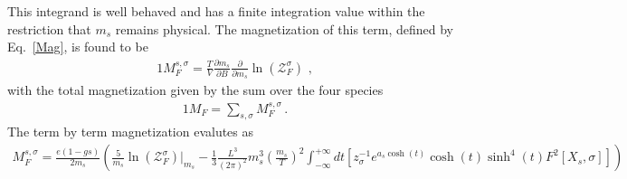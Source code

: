 \documentclass[
aps,
pra,
showpacs,
preprintnumbers,
amsmath,
amssymb,
footinbib
]{revtex4-2}
\newcommand*{\req}[1]{Eq.~{\eqref{#1}}}
\begin{document}
This integrand is well behaved and has a finite integration value within the restriction that $m_{s}$ remains physical. The magnetization of this term, defined by \req{Mag}, is found to be
\begin{alignat}{1}
    \label{FreelikeMag} M_{F}^{s,\sigma}=\frac{T}{V}\frac{\partial m_{s}}{\partial B}\frac{\partial}{\partial m_{s}}\ln(\mathcal{Z}_{F}^{\sigma})\,\,,
\end{alignat}
with the total magnetization given by the sum over the four species
\begin{alignat}{1}
    \label{TotalFreeMag} M_{F}=\sum_{s,\sigma}M_{F}^{s,\sigma}\,.
\end{alignat}
The term by term magnetization evalutes as
\begin{align}
  \label{MagExplicit} M_{F}^{s,\sigma} = \frac{e(1-gs)}{2m_{s}}\left(\frac{5}{m_{s}}\ln\left(\mathcal{Z}^{\sigma}_{F}\right)|_{m_{s}}-\frac{1}{3}\frac{L^{3}}{(2\pi)^{2}}m_{s}^{3}\left(\frac{m_{s}}{T}\right)^{2}\int_{-\infty}^{+\infty}dt\left[z_{\sigma}^{-1}e^{a_{s}\cosh(t)}\cosh(t)\sinh^{4}(t)F^{2}\left[X_{s},\sigma\right]\right]\right)
\end{align}
\end{document}
